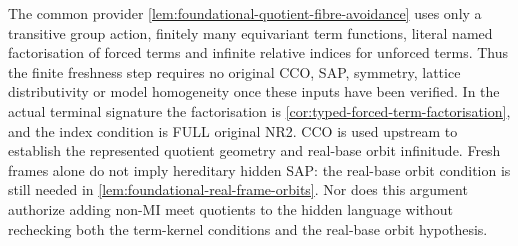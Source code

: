 \begin{remark}
\label{rem:typed-fresh-frame-cco-free}
The common provider \cref{lem:foundational-quotient-fibre-avoidance}
uses only a transitive group action, finitely many equivariant term
functions, literal named factorisation of forced terms and infinite
relative indices for unforced terms. Thus the finite freshness step
requires no original CCO, SAP, symmetry, lattice distributivity or
model homogeneity once these inputs have been verified.
In the actual terminal signature the factorisation is
\cref{cor:typed-forced-term-factorisation}, and the index condition is
FULL original NR2. CCO is used upstream to establish the represented
quotient geometry and real-base orbit infinitude. Fresh frames alone
do not imply hereditary hidden SAP: the real-base orbit condition is
still needed in \cref{lem:foundational-real-frame-orbits}.
Nor does this argument authorize adding non-MI meet quotients to
the hidden language without rechecking both the term-kernel conditions
and the real-base orbit hypothesis.
\end{remark}
